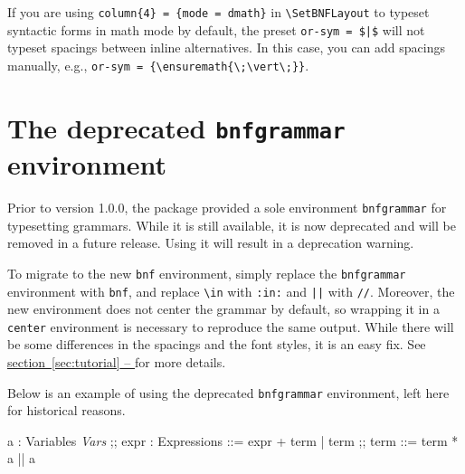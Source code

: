 \documentclass[11pt]{article}
\newcommand*{\secref}[1]{\hyperref[{#1}]{section~\ref*{#1} -- \emph{\nameref*{#1}}}}
\begin{document}
If you are using \verb/column{4} = {mode = dmath}/ in \verb/\SetBNFLayout/ to typeset syntactic forms in math mode by default, the preset \verb/or-sym = $|$/ will not typeset spacings between inline alternatives.
In this case, you can add spacings manually, e.g., \verb/or-sym = {\ensuremath{\;\vert\;}}/.


\section{The deprecated \texttt{bnfgrammar} environment}
Prior to version 1.0.0, the package provided a sole environment \verb/bnfgrammar/ for typesetting grammars.
While it is still available, it is now deprecated and will be removed in a future release.
Using it will result in a deprecation warning.

To migrate to the new \verb/bnf/ environment, simply replace the \verb/bnfgrammar/ environment with \verb/bnf/, and replace \verb/\in/ with \verb/:in:/ and \verb/||/ with \verb|//|.
Moreover, the new environment does not center the grammar by default, so wrapping it in a \verb/center/ environment is necessary to reproduce the same output.
While there will be some differences in the spacings and the font styles, it is an easy fix.
See \secref{sec:tutorial} for more details.

Below is an example of using the deprecated \verb/bnfgrammar/ environment, left here for historical reasons.
\begin{example}
  \begin{bnfgrammar}
    a : Variables \in \textit{Vars}
    ;;
    expr : Expressions ::=
      expr + term
    | term
    ;;
    term ::= term * a || a
  \end{bnfgrammar}
\end{example}
\end{document}
